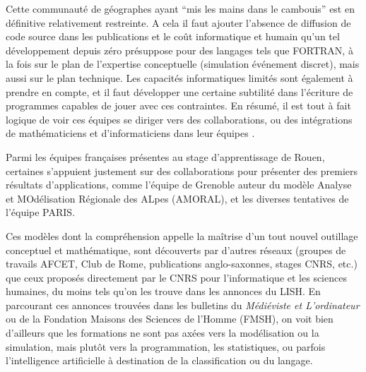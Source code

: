 Cette communauté de géographes ayant \enquote{mis les mains dans le cambouis} est en définitive relativement restreinte. A cela il faut ajouter l'absence de diffusion de code source dans les publications et le coût informatique et humain qu'un tel développement depuis zéro présuppose pour des langages tels que FORTRAN, à la fois sur le plan de l'expertise conceptuelle (simulation événement discret), mais aussi sur le plan technique. Les capacités informatiques limités sont également à prendre en compte, et il faut développer une certaine subtilité dans l'écriture de programmes capables de jouer avec ces contraintes. En résumé, il est tout à fait logique de voir ces équipes se diriger vers des collaborations, ou des intégrations de mathématiciens et d'informaticiens dans leur équipes \autocite{Pumain2014}. %

Parmi les équipes françaises présentes au stage d'apprentissage de Rouen, certaines s'appuient justement sur des collaborations pour présenter des premiers résultats d'applications, comme l’équipe de Grenoble auteur du modèle Analyse et MOdélisation Régionale des ALpes (AMORAL), et les diverses tentatives de l’équipe PARIS.  %

Ces modèles dont la compréhension appelle la maîtrise d'un tout nouvel outillage conceptuel et mathématique, sont découverts par d'autres réseaux (groupes de travails AFCET, Club de Rome, publications anglo-saxonnes, stages CNRS, etc.) que ceux proposés directement par le CNRS pour l'informatique et les sciences humaines, du moins tels qu'on les trouve dans les annonces du LISH. En parcourant ces annonces trouvées dans les bulletins du \textit{Médiéviste et L'ordinateur} ou de la Fondation Maisons des Sciences de l'Homme (FMSH), on voit bien d'ailleurs que les formations ne sont pas axées vers la modélisation ou la simulation, mais plutôt vers la programmation, les statistiques, ou parfois l'intelligence artificielle à destination de la classification ou du langage.

